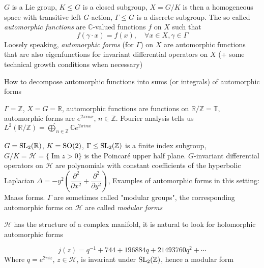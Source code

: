 \documentclass[main]{subfiles}
\begin{document}
\begin{definition}
$G$ is a Lie group, $K\leq G$ is a closed subgroup, $X=G/K$ is then a homogeneous space with transitive left $G$-action, $\Gamma\leq G$ is a discrete subgroup. The so called \textit{automorphic functions} are $\mathbb C$-valued functions $f$ on $X$ such that
\begin{equation}\label{Automorphic function}
f(\gamma\cdot x)=f(x),\quad\forall x\in X,\gamma\in\Gamma
\end{equation}
Loosely speaking, \textit{automorphic forms} (for $\Gamma$) on $X$ are automorphic functions that are also eigenfunctions for invariant differential operators on $X$ (+ some technical growth conditions when necessary)
\end{definition}

\begin{question}
How to decompose automorphic functions into sums (or integrals) of automorphic forms
\end{question}

\begin{example}
$\Gamma=\mathbb Z$, $X=G=\mathbb R$, automorphic functions are functions on $\mathbb R/\mathbb Z=\mathbb T$, automorphic forms are $e^{2\pi inx}$, $n\in\mathbb Z$. Fourier analysis tells us $L^2(\mathbb R/\mathbb Z)=\displaystyle\widehat\bigoplus_{n\in\mathbb Z}\mathbb Ce^{2\pi inx}$
\end{example}

\begin{example}
$G=\operatorname{SL}_2(\mathbb R)$, $K=\operatorname{SO}(2)$, $\Gamma\leq\operatorname{SL}_2(\mathbb Z)$ is a finite index subgroup, $G/K=\mathcal H=\{\operatorname{Im}z>0\}$ is the Poincar\'e upper half plane. $G$-invariant differential operators on $\mathcal H$ are polynomials with constant coefficients of the hyperbolic Laplacian $\Delta=-y^2\left(\dfrac{\partial^2}{\partial x^2}+\dfrac{\partial^2}{\partial y^2}\right)$, Examples of automorphic forms in this setting: Maass forms. $\Gamma$ are sometimes called "modular groups", the corresponding automorphic forms on $\mathcal H$ are called \textit{modular forms}
\end{example}

\begin{note}
$\mathcal H$ has the structure of a complex manifold, it is natural to look for holomorphic automorphic forms
\end{note}

\begin{example}
\[j(z)=q^{-1}+744+196884q+21493760q^2+\cdots\]
Where $q=e^{2\pi iz}$, $z\in\mathcal H$, is invariant under $\operatorname{SL}_2(\mathbb Z)$, hence a modular form
\end{example}
\end{document}
